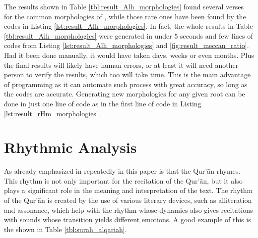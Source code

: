 The results shown in Table \ref{tbl:result_Alh_morphologies} found several verses for the common morphologies of , while those rare ones have been found by the codes in Listing \ref{lst:result_Alh_morphologies}. In fact, the whole results in Table \ref{tbl:result_Alh_morphologies} were generated in under 5 seconds and few lines of codes from Listing \ref{lst:result_Alh_morphologies} and \ref{fig:result_meccan_ratio}. Had it been done manually, it would have taken days, weeks or even months. Plus the final results will likely have human errors, or at least it will need another person to verify the results, which too will take time. This is the main advantage of programming as it can automate such process with great accuracy, so long as the codes are accurate. Generating new morphologies for any given root can be done in just one line of code as in the first line of code in Listing \ref{lst:result_rHm_morphologies}.


\section{Rhythmic Analysis}\label{sec:result_rhythmic_analysis}
As already emphasized in repeatedly in this paper is that the Qur'\=an rhymes. This rhythm is not only important for the recitation of the Qur'\=an, but it also plays a significant role in the meaning and interpretation of the text. The rhythm of the Qur'\=an is created by the use of various literary devices, such as alliteration and assonance, which help with the rhythm whose dynamics also gives recitations with sounds whose transition yields different emotions. A good example of this is the   shown in Table \ref{tbl:surah_alqariah}.

